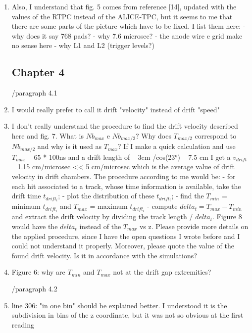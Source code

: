 \documentclass[a4paper,11pt,twoside]{article}
\begin{document}
\begin{enumerate}
\item Also, I understand that fig. 5 comes from reference [14], updated with the values of the RTPC instead of the ALICE-TPC, but it seems to me that there are some parts of the picture which have to be fixed. I list them here:
- why does it say 768 pads?
- why 7.6 microsec?
- the anode wire e grid make no sense here
- why L1 and L2 (trigger levels?) 
\textcolor{blue}{ } 

\subsection*{ Chapter 4}
	/paragraph 4.1
\item I would really prefer to call it drift "velocity" instead of drift "speed"
\textcolor{blue}{ } 

\item I don't really understand the procedure to find the drift velocity described here and fig. 7. What is $Nb_{max}$ e $Nb_{max/2}$? Why does $T_{max/2}$ correspond to $Nb_{max/2}$ and why is it used as $T_{max}$? If I make a quick calculation and use $T_{max}$ ~ 65 * 100ns and a drift length of ~ 3cm /cos(23°) ~ 7.5 cm I get a $v_{drift}$ ~ 1.15 cm/microsec << 5 cm/microsec which is the average value of drift velocity in drift chambers.
The procedure according to me would be:
- for each hit associated to a track, whose time information is available, take the drift time $t_{drift_{i}}$;
- plot the distribution of these $t_{drift_{i}}$;
- find the $T_{min}$ = minimum $t_{drift_{i}}$ and $T_{max}$ = maximum $t_{drift_{i}}$
- compute $delta_{t} = T_{max} - T_{min}$ and extract the drift velocity by dividing the track length / $delta_{t}$. Figure 8 would have the $delta_{t}$ instead of the $T_{max}$ vs z.
Please provide more details on the applied procedure, since I have the open questions I wrote before and I could not understand it properly. Moreover, please quote the value of the found drift velocity. Is it in accordance with the simulations?
\textcolor{blue}{ } 

\item Figure 6: why are $T_{min}$ and $T_{max}$ not at the drift gap extremities?
\textcolor{blue}{ } 

        /paragraph 4.2

\item line 306: "in one bin" should be explained better. I understood it is the subdivision in bins of the z coordinate, but it was not so obvious at the first reading
\textcolor{blue}{ } 


\end{enumerate}
\end{document}
